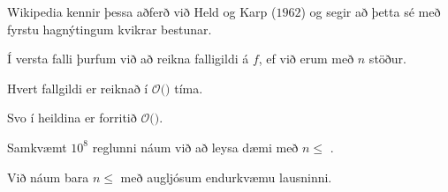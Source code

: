 {
	{
		\item<1-> Wikipedia kennir þessa aðferð við Held og Karp ($1962$) og segir að þetta sé með fyrstu hagnýtingum kvikrar bestunar.
		\item<2-> Í versta falli þurfum við að reikna  falligildi á $f$, ef við erum með $n$ stöður.
		\item<4-> Hvert fallgildi er reiknað í $\mathcal{O}($$)$ tíma.
		\item<6-> Svo í heildina er forritið $\mathcal{O}($\onslide<7->{$n^2 \cdot 2^n$}$)$.
		\item<8-> Samkvæmt $10^8$ reglunni náum við að leysa dæmi með $n \leq$ \onslide<9->{$18$}.
		\item<10-> Við náum bara $n \leq$  með augljósum endurkvæmu lausninni.
	}
}

{
}

{
}


